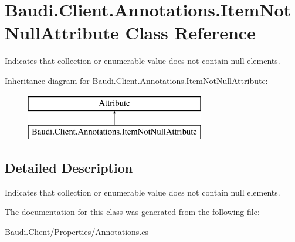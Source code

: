 \hypertarget{class_baudi_1_1_client_1_1_annotations_1_1_item_not_null_attribute}{}\section{Baudi.\+Client.\+Annotations.\+Item\+Not\+Null\+Attribute Class Reference}
\label{class_baudi_1_1_client_1_1_annotations_1_1_item_not_null_attribute}


Indicates that collection or enumerable value does not contain null elements.  


Inheritance diagram for Baudi.\+Client.\+Annotations.\+Item\+Not\+Null\+Attribute\+:\begin{figure}[H]
\begin{center}
\leavevmode
\includegraphics[height=2.000000cm]{class_baudi_1_1_client_1_1_annotations_1_1_item_not_null_attribute}
\end{center}
\end{figure}


\subsection{Detailed Description}
Indicates that collection or enumerable value does not contain null elements. 



The documentation for this class was generated from the following file\+:\begin{DoxyCompactItemize}
\item 
Baudi.\+Client/\+Properties/Annotations.\+cs\end{DoxyCompactItemize}
